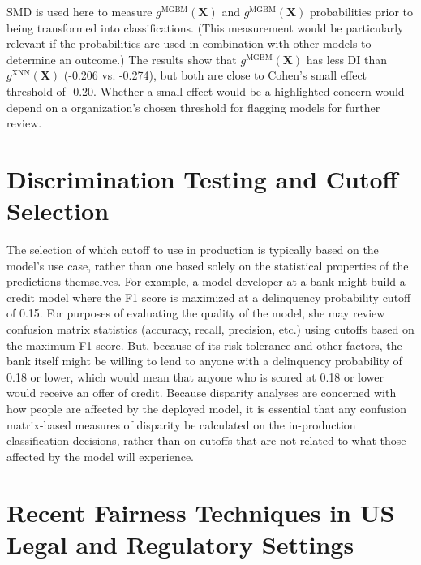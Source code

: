 \documentclass[information,article,submit,moreauthors,pdftex]{definitions/mdpi}
\begin{document}
SMD is used here to measure $g^\text{MGBM}(\mathbf{X})$ and $g^\text{MGBM}(\mathbf{X})$ probabilities prior to being transformed into classifications.  (This measurement would be particularly relevant if the probabilities are used in combination with other models to determine an outcome.)  The results show that $g^\text{MGBM}(\mathbf{X})$ has less DI than $g^\text{XNN}(\mathbf{X})$ (-0.206 vs. -0.274), but both are close to Cohen’s small effect threshold of -0.20. Whether a small effect would be a highlighted concern would depend on a organization’s chosen threshold for flagging models for further review. 

\section{Discrimination Testing and Cutoff Selection}\label{a_sec:cut}

The selection of which cutoff to use in production is typically based on the model’s use case, rather than one based solely on the statistical properties of the predictions themselves.  For example, a model developer at a bank might build a credit model where the F1 score is maximized at a delinquency probability cutoff of 0.15.  For purposes of evaluating the quality of the model, she may review confusion matrix statistics (accuracy, recall, precision, etc.) using cutoffs based on the maximum F1 score. But, because of its risk tolerance and other factors, the bank itself might be willing to lend to anyone with a delinquency probability of 0.18 or lower, which would mean that anyone who is scored at 0.18 or lower would receive an offer of credit.  Because disparity analyses are concerned with how people are affected by the deployed model, it is essential that any confusion matrix-based measures of disparity be calculated on the in-production classification decisions, rather than on cutoffs that are not related to what those affected by the model will experience.

\section{Recent Fairness Techniques in US Legal and Regulatory Settings}\label{a_sec:comp}
\end{document}
